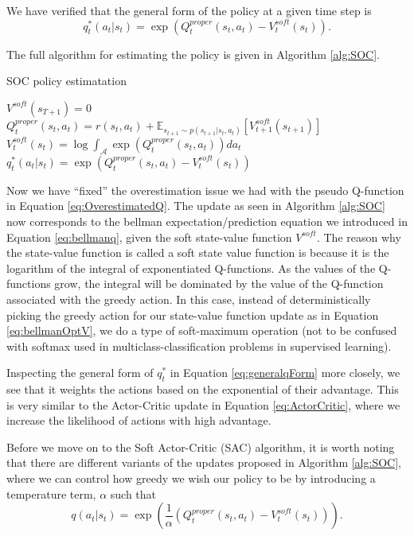 \documentclass{report}
\numberwithin{equation}{section}
\numberwithin{figure}{section}
\numberwithin{table}{section}
\numberwithin{algorithm}{section}
\begin{document}
We have verified that the general 
form of the policy at a given time step is 
\begin{equation}\label{eq:generalqForm}
  q^*_t(a_t|s_t)=\exp(Q^{proper}_{t}(s_t,a_t)-V^{soft}_{t}(s_t)). 
\end{equation}

The full algorithm for estimating the policy is given in Algorithm 
\ref{alg:SOC}.

\begin{algorithm}
  \caption{SOC policy estimatation}
  \label{alg:SOC}
  \begin{algorithmic}
    \State $V^{soft}(s_{T+1})=0$
    \State $Q^{proper}_t(s_t, a_t)=r(s_t, a_t) + \mathbb{E}_{s_{t+1}\sim p(s_{t+1}|s_t,a_t)}[V^{soft}_{t+1}(s_{t+1})]$
    \State $V^{soft}_t(s_t)=\log\int_{\mathcal{A}}\exp(Q^{proper}_t(s_t,a_t))da_t$
    \State $q_t^*(a_t|s_t)=\exp(Q^{proper}_t(s_t,a_t)-V^{soft}_t(s_t))$
    \EndFor
  \end{algorithmic}
\end{algorithm}

Now we have ``fixed'' the overestimation issue we had with the 
pseudo Q-function in Equation \ref{eq:OverestimatedQ}. The update 
as seen in Algorithm \ref{alg:SOC} now corresponds to the 
bellman expectation/prediction equation we introduced
in Equation \ref{eq:bellmanq}, given the soft state-value function 
$V^{soft}$. The reason why the state-value function is called a 
soft state value function is because it is the logarithm 
of the integral of exponentiated Q-functions. As the values 
of the Q-functions grow, the integral will be dominated by 
the value of the Q-function associated with the greedy action. In this 
case, instead of deterministically picking the greedy action 
for our state-value function update as in Equation \ref{eq:bellmanOptV}, 
we do a type of soft-maximum operation (not to be confused with softmax 
used in multiclass-classification problems in supervised learning).

Inspecting the general form of $q^*_t$ in Equation \ref{eq:generalqForm}
more closely, we see that it weights the actions based on the
exponential of their advantage. This is very similar to the 
Actor-Critic update in Equation \ref{eq:ActorCritic}, where 
we increase the 
likelihood of actions with high advantage.

Before we move on to the Soft Actor-Critic (SAC) \citep{SAC2} 
algorithm, it is worth noting that there are different variants of 
the updates proposed in Algorithm \ref{alg:SOC}, where 
we can control how greedy we wish our policy to be by 
introducing a temperature term, $\alpha$ such that 
\begin{equation*}
  q(a_t|s_t)=\exp(\frac{1}{\alpha}(Q^{proper}_t(s_t,a_t)-V^{soft}_t(s_t))).  
\end{equation*}
\end{document}
